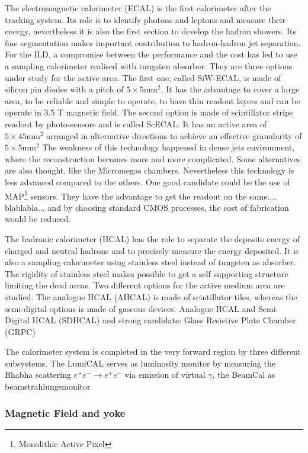       The electromagnetic calorimeter (ECAL) is the first calorimeter after the tracking system.
      Its role is to identify photons and leptons and measure their energy, nevertheless it is also the first section to develop the hadron showers.
      Its fine segmentation makes important contribution to hadron-hadron jet separation.
      For the ILD, a compromise between the performance and the cost has led to use a sampling calorimeter realised with tungsten absorber.
      They are three options under study for the active area.
      The first one, called SiW-ECAL, is made of silicon pin diodes with a pitch of $5 \times 5 \text{mm}^2$. 
      It has the advantage to cover a large area, to be reliable and simple to operate, to have thin readout layers and can be operate in 3.5 T magnetic field.
      The second option is made of scintillator strips readout by photo-sensors and is called ScECAL.
      It has an active area of $5 \times 45 \text{mm}^2$ arranged in alternative directions to achieve an effective granularity of $5 \times 5 \text{mm}^2$ 
      The weakness of this technology happened in dense jets environment, where the reconstruction becomes more and more complicated.
      Some alternatives are also thought, like the Micromegas chambers. Nevertheless this technology is less advanced compared to the others.
      One good candidate could be the use of MAP\footnote{Monolithic Active Pixel} sensors.
      They have the advantage to get the readout on the same.... blablabla...
      and by choosing standard CMOS processes, the cost of fabrication would be reduced.

      The hadronic calorimeter (HCAL) has the role to separate the deposits energy of charged and neutral hadrons and to precisely measure the energy deposited.
      It is also a sampling calorimeter using stainless steel instead of tungsten as absorber. 
      The rigidity of stainless steel makes possible to get a self supporting structure limiting the dead areas.
      Two different options for the active medium area are studied.
      The analogue HCAL (AHCAL) is made of scintillator tiles, whereas the semi-digital options is made of gaseous devices.
      Analogue HCAL and Semi-Digital HCAL (SDHCAL)  and strong candidate: Glass Resistive Plate Chamber (GRPC)

      The calorimeter system is completed in the very forward region by three different subsystems. 
      The LumiCAL serves as luminosity monitor by measuring the Bhabha scattering $e^+e^- \rightarrow e^+e^-$ via emission of virtual $\gamma$, the BeamCal as beamstrahlungsmonitor 

      

      \subsubsection{Magnetic Field and yoke}
